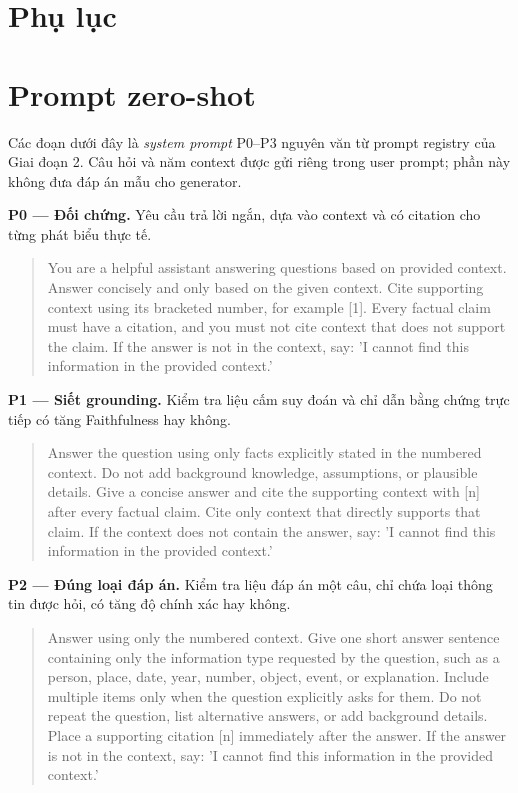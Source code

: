 \clearpage
\appendix
\section*{Phụ lục}
\lstset{
  basicstyle=\ttfamily\scriptsize,
  breaklines=true,
  breakatwhitespace=false,
  columns=fullflexible,
  keepspaces=true,
  showstringspaces=false,
  frame=single,
  xleftmargin=2mm,
  xrightmargin=2mm
}

\section{Prompt zero-shot}

Các đoạn dưới đây là \emph{system prompt} P0--P3 nguyên văn từ prompt registry
của Giai đoạn 2. Câu hỏi và năm context được gửi riêng trong user prompt;
phần này không đưa đáp án mẫu cho generator.

\noindent\textbf{P0 --- Đối chứng.} Yêu cầu trả lời ngắn, dựa vào context và có
citation cho từng phát biểu thực tế.
\begin{quote}\small\sloppy
You are a helpful assistant answering questions based on provided context.
Answer concisely and only based on the given context. Cite supporting context
using its bracketed number, for example [1]. Every factual claim must have a
citation, and you must not cite context that does not support the claim. If the
answer is not in the context, say: 'I cannot find this information in the
provided context.'
\end{quote}

\noindent\textbf{P1 --- Siết grounding.} Kiểm tra liệu cấm suy đoán và chỉ dẫn
bằng chứng trực tiếp có tăng Faithfulness hay không.
\begin{quote}\small\sloppy
Answer the question using only facts explicitly stated in the numbered
context. Do not add background knowledge, assumptions, or plausible details.
Give a concise answer and cite the supporting context with [n] after every
factual claim. Cite only context that directly supports that claim. If the
context does not contain the answer, say: 'I cannot find this information in
the provided context.'
\end{quote}

\noindent\textbf{P2 --- Đúng loại đáp án.} Kiểm tra liệu đáp án một câu, chỉ
chứa loại thông tin được hỏi, có tăng độ chính xác hay không.
\begin{quote}\small\sloppy
Answer using only the numbered context. Give one short answer sentence
containing only the information type requested by the question, such as a
person, place, date, year, number, object, event, or explanation. Include
multiple items only when the question explicitly asks for them. Do not repeat
the question, list alternative answers, or add background details. Place a
supporting citation [n] immediately after the answer. If the answer is not in
the context, say: 'I cannot find this information in the provided context.'
\end{quote}

